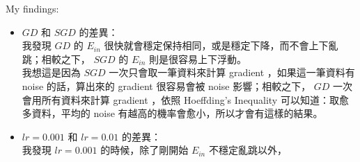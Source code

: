 \documentclass[12pt,a4paper]{article}
\begin{document}
My findings:
\begin{itemize}
	\item $GD$ 和 $SGD$ 的差異： \\
	我發現 $GD$ 的 $E_{in}$ 很快就會穩定保持相同，或是穩定下降，而不會上下亂跳；相較之下， $SGD$ 的 $E_{in}$ 則是很容易上下浮動。 \\
	我想這是因為 $SGD$ 一次只會取一筆資料來計算 gradient ，如果這一筆資料有 noise 的話，算出來的 gradient 很容易會被 noise 影響；相較之下， $GD$ 一次會用所有資料來計算 gradient ，依照 Hoeffding's Inequality 可以知道：取愈多資料，平均的 noise 有越高的機率會愈小，所以才會有這樣的結果。
	\item $lr = 0.001$ 和 $lr = 0.01$ 的差異： \\
	我發現 $lr = 0.001$ 的時候，除了剛開始 $E_{in}$ 不穩定亂跳以外，
\end{itemize}
\end{document}
